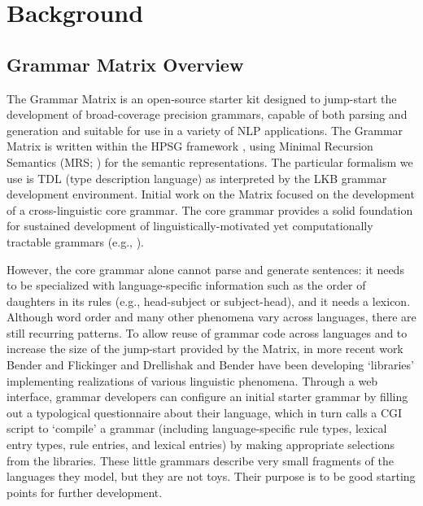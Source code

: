 \documentclass[11pt]{article}
\begin{document}
\section{Background}
\label{GM}

\subsection{Grammar Matrix Overview}

The Grammar Matrix is an open-source starter kit designed to
jump-start the development of broad-coverage precision grammars,
capable of both parsing and generation and suitable for use in a
variety of NLP applications.  The Grammar Matrix is written within the
HPSG framework \cite{Pol:Sag:94,Sag:Was:Ben:03}, using Minimal
Recursion Semantics (MRS; \cite{Cop:Fli:Pol:Sag:05}) for the semantic
representations. The particular formalism we use is TDL
(type description language) as interpreted by the LKB
\cite{Copestake02} grammar development environment.  Initial work on
the Matrix \cite{Ben:Fli:Oep:02, Fli:Ben:03} focused on the
development of a cross-linguistic core grammar.  The core grammar
provides a solid foundation for sustained development of
linguistically-motivated yet computationally tractable grammars (e.g.,
\cite{Hel:Hau:03,Kor:Neu:05}).  

However, the core grammar alone cannot parse and generate sentences:
it needs to be specialized with language-specific information such as
the order of daughters in its rules (e.g., head-subject or
subject-head), and it needs a lexicon.  Although word order and many
other phenomena vary across languages, there are still recurring
patterns.  To allow reuse of grammar code across languages and to
increase the size of the jump-start provided by the Matrix, in more
recent work Bender and Flickinger  and
Drellishak and Bender  have been developing
`libraries' implementing realizations of various linguistic phenomena.
Through a web interface, grammar developers can configure an initial
starter grammar by filling out a typological questionnaire about their
language, which in turn calls a CGI script to `compile' a grammar
(including language-specific rule types, lexical entry types, rule
entries, and lexical entries) by making appropriate selections from
the libraries. These little grammars describe very small fragments of
the languages they model, but they are not toys.  Their purpose is to
be good starting points for further development.
\end{document}
